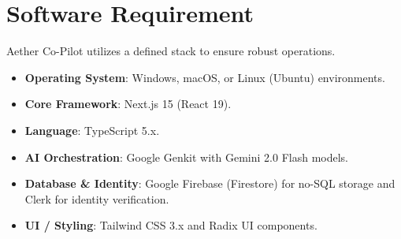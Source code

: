 \section{Software Requirement}
Aether Co-Pilot utilizes a defined stack to ensure robust operations.
\begin{itemize}
    \item \textbf{Operating System}: Windows, macOS, or Linux (Ubuntu) environments.
    \item \textbf{Core Framework}: Next.js 15 (React 19).
    \item \textbf{Language}: TypeScript 5.x.
    \item \textbf{AI Orchestration}: Google Genkit with Gemini 2.0 Flash models.
    \item \textbf{Database \& Identity}: Google Firebase (Firestore) for no-SQL storage and Clerk for identity verification.
    \item \textbf{UI / Styling}: Tailwind CSS 3.x and Radix UI components.
\end{itemize}

\newpage
